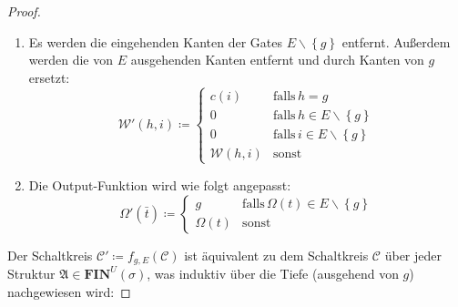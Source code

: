 \begin{proof}
\begin{enumerate}
\item Es werden die eingehenden Kanten der Gates $E\backslash\left\{ g\right\} $
entfernt. Außerdem werden die von $E$ ausgehenden Kanten entfernt
und durch Kanten von $g$ ersetzt:
\[
\mathcal{W}'\left(h,i\right)\coloneqq\begin{cases}
c\left(i\right) & \mathrm{falls}\,h=g\\
0 & \mathrm{falls}\,h\in E\backslash\left\{ g\right\} \\
0 & \mathrm{falls}\,i\in E\backslash\left\{ g\right\} \\
\mathcal{W}\left(h,i\right) & \mathrm{sonst}
\end{cases}
\]
\item Die Output-Funktion wird wie folgt angepasst:
\[
\Omega'\left(\bar{t}\right)\coloneqq\begin{cases}
g & \mathrm{falls}\,\Omega\left(t\right)\in E\backslash\left\{ g\right\} \\
\Omega\left(t\right) & \mathrm{sonst}
\end{cases}
\]
\end{enumerate}
Der Schaltkreis $\mathcal{C}'\coloneqq f_{g,E}\left(\mathcal{C}\right)$
ist äquivalent zu dem Schaltkreis $\mathcal{C}$ über jeder Struktur
$\mathfrak{A}\in\mathbf{FIN}^{U}\left(\sigma\right)$, was induktiv
über die Tiefe (ausgehend von $g$) nachgewiesen wird:


\end{proof}

